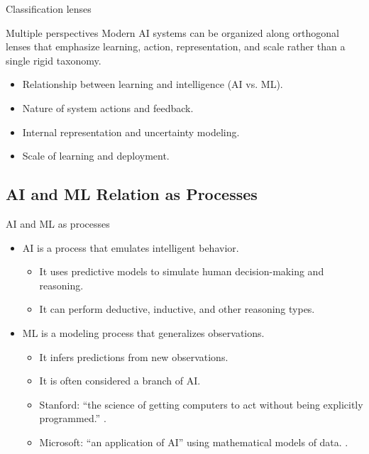 \documentclass[12pt]{beamer}
\begin{document}
\begin{frame}{Classification lenses}
  \begin{conceptbox}{Multiple perspectives}
    Modern AI systems can be organized along orthogonal lenses that emphasize learning, action,
    representation, and scale rather than a single rigid taxonomy.
  \end{conceptbox}
  \begin{itemize}
    \item Relationship between learning and intelligence (AI vs. ML).
    \item Nature of system actions and feedback.
    \item Internal representation and uncertainty modeling.
    \item Scale of learning and deployment.
  \end{itemize}
\end{frame}

\subsection{AI and ML Relation as Processes}
\begin{frame}{AI and ML as processes}
  \begin{itemize}
    \item AI is a process that emulates intelligent behavior.
      \begin{itemize}
        \item It uses predictive models to simulate human decision-making and reasoning.
        \item It can perform deductive, inductive, and other reasoning types.
      \end{itemize}
    \item ML is a modeling process that generalizes observations.
      \begin{itemize}
        \item It infers predictions from new observations.
        \item It is often considered a branch of AI.
        \item Stanford: ``the science of getting computers to act without being explicitly programmed.''
          .
        \item Microsoft: ``an application of AI'' using mathematical models of data.
          .
      \end{itemize}
  \end{itemize}
\end{frame}
\end{document}
